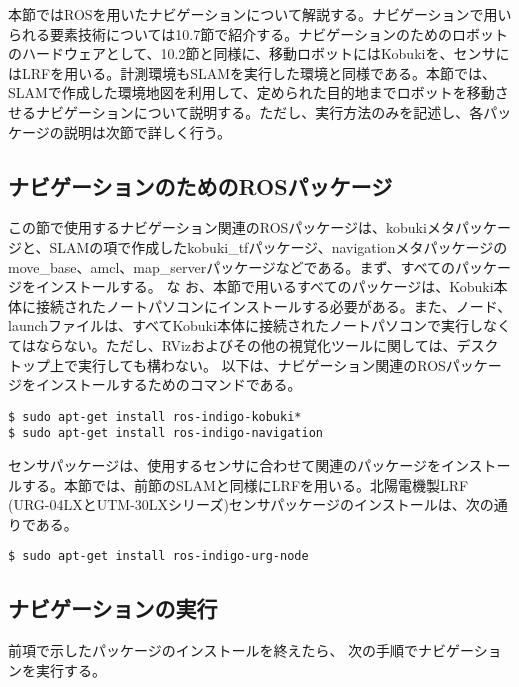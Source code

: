本節ではROSを用いたナビゲーションについて解説する。ナビゲーションで用いられる要素技術については10.7節で紹介する。ナビゲーションのためのロボットのハードウェアとして、10.2節と同様に、移動ロボットにはKobukiを、センサにはLRFを用いる。計測環境もSLAMを実行した環境と同様である。本節では、SLAMで作成した環境地図を利用して、定められた目的地までロボットを移動させるナビゲーションについて説明する。ただし、実行方法のみを記述し、各パッケージの説明は次節で詳しく行う。

\subsection{ナビゲーションのためのROSパッケージ}

この節で使用するナビゲーション関連のROSパッケージは、kobukiメタパッケージと、SLAMの項で作成したkobuki\_tfパッケージ、navigationメタパッケージのmove\_base、amcl、map\_serverパッケージなどである。まず、すべてのパッケージをインストールする。 な お、本節で用いるすべてのパッケージは、Kobuki本体に接続されたノートパソコンにインストールする必要がある。また、ノード、launchファイルは、すべてKobuki本体に接続されたノートパソコンで実行しなくてはならない。ただし、RVizおよびその他の視覚化ツールに関しては、デスクトップ上で実行しても構わない。
以下は、ナビゲーション関連のROSパッケージをインストールするためのコマンドである。

\begin{lstlisting}[language=ROS]
$ sudo apt-get install ros-indigo-kobuki*
$ sudo apt-get install ros-indigo-navigation
\end{lstlisting}

センサパッケージは、使用するセンサに合わせて関連のパッケージをインストールする。本節では、前節のSLAMと同様にLRFを用いる。北陽電機製LRF (URG-04LXとUTM-30LXシリーズ)センサパッケージのインストールは、次の通りである。

\begin{lstlisting}[language=ROS]
$ sudo apt-get install ros-indigo-urg-node
\end{lstlisting}

\subsection{ナビゲーションの実行}

前項で示したパッケージのインストールを終えたら、  次の手順でナビゲーションを実行する。\\

